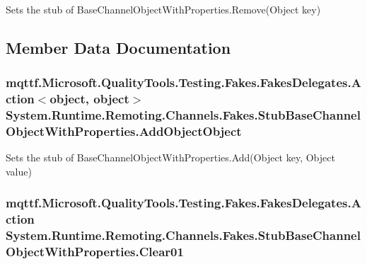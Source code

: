 Sets the stub of Base\-Channel\-Object\-With\-Properties.\-Remove(\-Object key)



\subsection{Member Data Documentation}
\hypertarget{class_system_1_1_runtime_1_1_remoting_1_1_channels_1_1_fakes_1_1_stub_base_channel_object_with_properties_abf3b2f5e03ce633276a090720d8b6caf}{
\subsubsection[{Add\-Object\-Object}]{\setlength{\rightskip}{0pt plus 5cm}mqttf.\-Microsoft.\-Quality\-Tools.\-Testing.\-Fakes.\-Fakes\-Delegates.\-Action$<$object, object$>$ System.\-Runtime.\-Remoting.\-Channels.\-Fakes.\-Stub\-Base\-Channel\-Object\-With\-Properties.\-Add\-Object\-Object}}\label{class_system_1_1_runtime_1_1_remoting_1_1_channels_1_1_fakes_1_1_stub_base_channel_object_with_properties_abf3b2f5e03ce633276a090720d8b6caf}


Sets the stub of Base\-Channel\-Object\-With\-Properties.\-Add(\-Object key, Object value)

\hypertarget{class_system_1_1_runtime_1_1_remoting_1_1_channels_1_1_fakes_1_1_stub_base_channel_object_with_properties_aa1734ad7853f6a43b4c68df109ee58bf}{
\subsubsection[{Clear01}]{\setlength{\rightskip}{0pt plus 5cm}mqttf.\-Microsoft.\-Quality\-Tools.\-Testing.\-Fakes.\-Fakes\-Delegates.\-Action System.\-Runtime.\-Remoting.\-Channels.\-Fakes.\-Stub\-Base\-Channel\-Object\-With\-Properties.\-Clear01}}\label{class_system_1_1_runtime_1_1_remoting_1_1_channels_1_1_fakes_1_1_stub_base_channel_object_with_properties_aa1734ad7853f6a43b4c68df109ee58bf}


